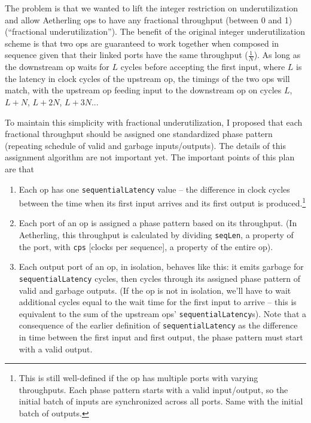 \documentclass[12pt]{article}
\begin{document}
The problem is that we wanted to lift the integer restriction on
underutilization and allow Aetherling ops to have any fractional
throughput (between 0 and 1) (``fractional underutilization''). The
benefit of the original integer underutilization scheme is that two
ops are guaranteed to work together when composed in sequence given
that their linked ports have the same throughput ($\frac{1}{N}$). As
long as the downstream op waits for $L$ cycles before accepting the
first input, where $L$ is the latency in clock cycles of the upstream
op, the timings of the two ops will match, with the upstream op
feeding input to the downstream op on cycles $L$, $L+N$, $L+2N$,
$L+3N$...

To maintain this simplicity with fractional underutilization, I
proposed that each fractional throughput should be assigned one
standardized phase pattern (repeating schedule of valid and garbage
inputs/outputs). The details of this assignment algorithm are not
important yet. The important points of this plan are that
\begin{enumerate}
\item Each op has one \texttt{sequentialLatency} value -- the
  difference in clock cycles between the time when its first input
  arrives and its first output is produced.\footnote{This is still
    well-defined if the op has multiple ports with varying
    throughputs. Each phase pattern starts with a valid input/output,
    so the initial batch of inputs are synchronized across all
    ports. Same with the initial batch of outputs. }
\item Each port of an op is assigned a phase pattern based on its
  throughput. (In Aetherling, this throughput is calculated by
  dividing \texttt{seqLen}, a property of the port, with \texttt{cps}
  [clocks per sequence], a property of the entire op).
\item Each output port of an op, in isolation, behaves like this: it
  emits garbage for \texttt{sequentialLatency} cycles, then cycles
  through its assigned phase pattern of valid and garbage outputs. (If
  the op is not in isolation, we'll have to wait additional cycles
  equal to the wait time for the first input to arrive -- this is
  equivalent to the sum of the upstream ops'
  \texttt{sequentialLatency}s). Note that a consequence of the earlier
  definition of \texttt{sequentialLatency} as the difference in time
  between the first input and first output, the phase pattern must
  start with a valid output.
\end{enumerate}
\end{document}
